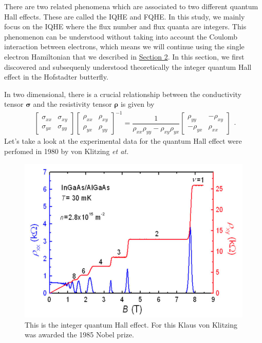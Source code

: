 \documentclass{report}
\newcommand{\f}[2]{\dfrac{#1}{#2}}
\begin{document}
There are two related phenomena which are associated to two different quantum Hall effects. These are called the \ac{IQHE} and \ac{FQHE}. In this study, we mainly focus on the \ac{IQHE} where the flux number and flux quanta are integers. This phenomenon can be understood without taking into account the Coulomb interaction between electrons, which means we will continue using the single electron Hamiltonian that we described in \hyperref[Section 2]{Section 2}. In this section, we first discovered and subsequenly understood theoretically the integer quantum Hall effect in the Hofstadter butterfly.

In two dimensional, there is a crucial relationship between the conductivity tensor $\boldsymbol{\sigma}$ and the resistivity tensor $\boldsymbol{\rho}$ is given by
\begin{equation}
	\begin{aligned}
		\begin{bmatrix}
			\sigma_{xx} & \sigma_{xy} \\
			\sigma_{yx} & \sigma_{yy}
		\end{bmatrix}
		\begin{bmatrix}
			\rho_{xx} & \rho_{xy} \\
			\rho_{yx} & \rho_{yy}
		\end{bmatrix}^{-1}
		=
		\f{1}{\rho_{xx} \rho_{yy} - \rho_{xy} \rho_{yx}}
		\begin{bmatrix}
			\rho_{yy}  & -\rho_{xy} \\
			-\rho_{yx} & \rho_{xx}
		\end{bmatrix}
	\end{aligned}.
\end{equation}
Let's take a look at the experimental data for the quantum Hall effect were perfomed in 1980 by von Klitzing \textit{et at.} \cite{klitzing90}
\begin{figure}[H]
	\centering
	\includegraphics[width=0.7\linewidth]{pic/quantumhall.jpg}
	\caption[Quantum Hall effect by von Klitzing.]{This is the integer quantum Hall effect. For this Klaus von Klitzing was awarded the 1985 Nobel prize.}
\end{figure}
\end{document}
